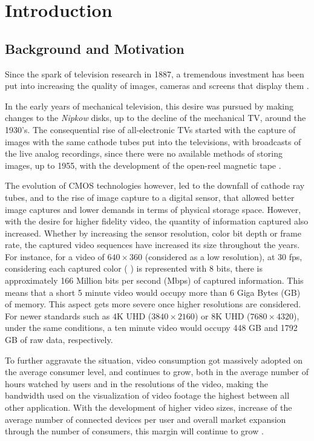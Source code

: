 \cleardoublepage
{}
\chapter{Introduction}

\section{Background and Motivation}

Since the spark of television research in 1887, a tremendous investment has been put into increasing the quality of images, cameras and screens that display them \cite{schubinWhatSparkedVideo2017}.

In the early years of mechanical television, this desire was pursued by making changes to the \textit{Nipkow} disks, up to the decline of the mechanical TV, around the 1930's. The consequential rise of all-electronic TVs started with the capture of images with the same cathode tubes put into the televisions, with broadcasts of the live analog recordings, since there were no available methods of storing images, up to 1955, with the development of the open-reel magnetic tape \cite{jacobsBriefHistoryVideo}.

The evolution of \Gls{CMOS} technologies however, led to the downfall of cathode ray tubes, and to the rise of image capture to a digital sensor, that allowed better image captures and lower demands in terms of physical storage space. However, with the desire for higher fidelity video, the quantity of information captured also increased. Whether by increasing the sensor resolution, color bit depth or frame rate, the captured video sequences have increased its size throughout the years. For instance, for a video of $640 \times 360$ (considered as a low resolution), at 30 \gls{fps}, considering each captured color (
) is represented with 8 bits, there is approximately 166 Million bits per second (Mbps) of captured information. This means that a short 5 minute video would occupy more than 6 Giga Bytes (GB) of memory. This aspect gets more severe once higher resolutions are considered. For newer standards such as 4K \Gls{UHD} ($3840 \times 2160$) or 8K UHD ($ 7680 \times 4320$), under the same conditions, a ten minute video would occupy 448 GB and 1792 GB of raw data, respectively.

To further aggravate the situation, video consumption got massively adopted on the average consumer level, and continues to grow, both in the average number of hours watched by users and in the resolutions of the video, making the bandwidth used on the visualization of video footage the highest between all other application. With the development of higher video sizes, increase of the average number of connected devices per user and overall market expansion through the number of consumers, this margin will continue to grow \cite[Trends~1~\&~4]{CiscoVisualNetworking}.

